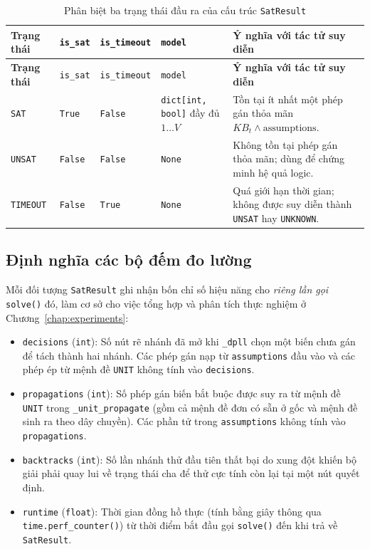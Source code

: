 \begingroup
\small\linespread{1.15}\selectfont
\begin{longtable}{@{}p{}p{}p{}p{}p{}@{}}
\caption{Phân biệt ba trạng thái đầu ra của cấu trúc \texttt{SatResult}}\label{tab:sat_result}\\
\toprule
\textbf{Trạng thái} & \texttt{is\_sat} & \texttt{is\_timeout} & \texttt{model} & \textbf{Ý nghĩa với tác tử suy diễn} \\
\midrule
\endfirsthead
\toprule
\textbf{Trạng thái} & \texttt{is\_sat} & \texttt{is\_timeout} & \texttt{model} & \textbf{Ý nghĩa với tác tử suy diễn} \\
\midrule
\endhead
\texttt{SAT} & \texttt{True} & \texttt{False} & \texttt{dict[int, bool]} đầy đủ $1 \dots V$ & Tồn tại ít nhất một phép gán thỏa mãn $KB_t \land \text{assumptions}$. \\
\addlinespace
\texttt{UNSAT} & \texttt{False} & \texttt{False} & \texttt{None} & Không tồn tại phép gán thỏa mãn; dùng để chứng minh hệ quả logic. \\
\addlinespace
\texttt{TIMEOUT} & \texttt{False} & \texttt{True} & \texttt{None} & Quá giới hạn thời gian; không được suy diễn thành \texttt{UNSAT} hay \texttt{UNKNOWN}. \\
\bottomrule
\end{longtable}
\endgroup

\subsection{Định nghĩa các bộ đếm đo lường}
Mỗi đối tượng \texttt{SatResult} ghi nhận bốn chỉ số hiệu năng cho \textit{riêng lần gọi} \texttt{solve()} đó, làm cơ sở cho việc tổng hợp và phân tích thực nghiệm ở Chương~\ref{chap:experiments}:
\begin{itemize}
    \item \texttt{decisions} (\texttt{int}): Số nút rẽ nhánh đã mở khi \texttt{\_dpll} chọn một biến chưa gán để tách thành hai nhánh. Các phép gán nạp từ \texttt{assumptions} đầu vào và các phép ép từ mệnh đề \texttt{UNIT} không tính vào \texttt{decisions}.
    \item \texttt{propagations} (\texttt{int}): Số phép gán biến bắt buộc được suy ra từ mệnh đề \texttt{UNIT} trong \texttt{\_unit\_propagate} (gồm cả mệnh đề đơn có sẵn ở gốc và mệnh đề sinh ra theo dây chuyền). Các phần tử trong \texttt{assumptions} không tính vào \texttt{propagations}.
    \item \texttt{backtracks} (\texttt{int}): Số lần nhánh thử đầu tiên thất bại do xung đột khiến bộ giải phải quay lui về trạng thái cha để thử cực tính còn lại tại một nút quyết định.
    \item \texttt{runtime} (\texttt{float}): Thời gian đồng hồ thực (tính bằng giây thông qua \texttt{time.perf\_counter()}) từ thời điểm bắt đầu gọi \texttt{solve()} đến khi trả về \texttt{SatResult}.
\end{itemize}

